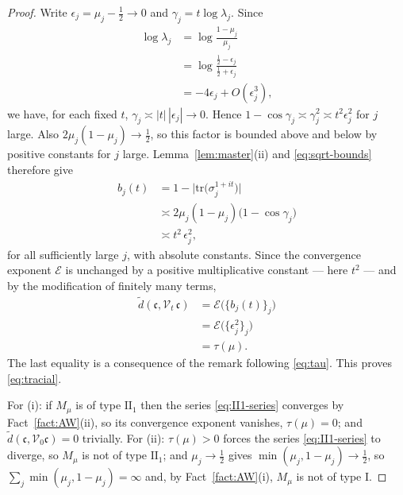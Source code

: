 \documentclass[twoside,11pt,letter]{article}
\def\cV{{\mathcal{V}}}
\def\fc{{\mathfrak{c}}}
\newcommand{\tr}{\mathrm{tr}}
\newcommand{\cexp}{\mathcal{E}}  %
\theoremstyle{definition}
\theoremstyle{definition}
\theoremstyle{plain}
\begin{document}
\begin{proof}
Write $\epsilon_j = \mu_j - \tfrac12 \to 0$ and $\gamma_j = t \log \lambda_j$. Since
\begin{equation*}
\begin{split}
\log \lambda_j &= \log \frac{1-\mu_j}{\mu_j}\\
&= \log \frac{ \tfrac12 - \epsilon_j }{ \tfrac12 + \epsilon_j }\\
&= -4\epsilon_j + O(\epsilon_j^3),
\end{split}
\end{equation*}
we have, for each fixed $t$, $\gamma_j \asymp |t|\, |\epsilon_j| \to 0$. Hence $1 - \cos\gamma_j \asymp \gamma_j^2 \asymp t^2 \epsilon_j^2$ for $j$ large. Also $2\mu_j(1-\mu_j) \to \tfrac12$, so this factor is bounded above and below by positive constants for $j$ large. Lemma~\ref{lem:master}(ii) and
\eqref{eq:sqrt-bounds} therefore give
\begin{equation*}
\begin{split}
b_j(t) &= 1 - \bigl| \tr\bigl( \sigma_j^{1+it} \bigr) \bigr|\\
&\asymp  2\mu_j(1-\mu_j) \bigl( 1 - \cos \gamma_j \bigr)\\
&\asymp  t^2\, \epsilon_j^2,
\end{split}
\end{equation*}
for all sufficiently large $j$, with absolute constants. Since the convergence exponent $\cexp$ is unchanged by a positive multiplicative constant --- here $t^2$ --- and by the modification of finitely many terms,
\begin{equation*}
\begin{split}
\tilde d(\fc, \cV_t\,\fc)&= \cexp\bigl( \{ b_j(t) \}_j \bigr)\\
&= \cexp\bigl( \{ \epsilon_j^2 \}_j \bigr)\\
&= \tau(\mu).
\end{split}
\end{equation*}
The last equality is a consequence of the remark following \eqref{eq:tau}. This proves \eqref{eq:tracial}.

For (i): if $M_\mu$ is of type $\mathrm{II}_1$ then the series \eqref{eq:II1-series} converges by Fact~\ref{fact:AW}(ii), so its convergence exponent vanishes, $\tau(\mu) = 0$; and $\tilde d(\fc,\cV_0\fc) = 0$ trivially. For (ii): $\tau(\mu) > 0$ forces the series \eqref{eq:II1-series} to diverge, so $M_\mu$ is not of type
$\mathrm{II}_1$; and $\mu_j \to \tfrac12$ gives $\min(\mu_j, 1-\mu_j) \to \tfrac12$, so $\sum_j \min(\mu_j, 1-\mu_j) = \infty$ and, by Fact~\ref{fact:AW}(i),
$M_\mu$ is not of type $\mathrm{I}$.
\end{proof}
\end{document}
